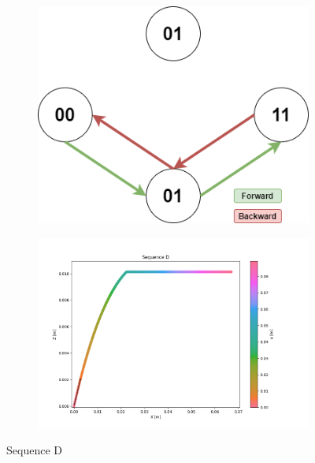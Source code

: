         \begin{figure}[h]
            \begin{subfigure}{.3\textwidth}
            \includegraphics[width=\textwidth]{images/Sequences-Sequence D.png}
            \end{subfigure}%
            \begin{subfigure}{.7\textwidth}
            \includegraphics[width=\textwidth]{images/D.png}
            \end{subfigure}
            \caption{Sequence D}
        \end{figure}

